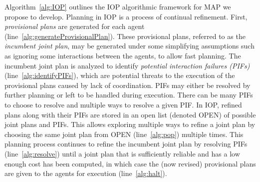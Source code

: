\documentclass[11pt]{article}
\begin{document}

Algorithm~\ref{alg:IOP} outlines the IOP algorithmic framework for MAP we propose to develop. Planning in IOP is a process of continual refinement.  
First, {\em provisional plans} are generated for each agent  (line~\ref{alg:generateProvisionalPlan}). These provisional plans, referred to as the {\em incumbent joint plan}, may be generated under some simplifying assumptions such as ignoring some interactions between the agents, to allow fast planning. The incumbent joint plan is analyzed to identify {\em potential interaction failures (PIFs)} (line~\ref{alg:identifyPIFs}), which are potential threats to the execution of the provisional plans caused by lack of coordination. 
PIFs may either be resolved by further planning or left to be handled during execution. 
There can be many PIFs to choose to resolve and multiple ways to resolve a given PIF. In IOP, refined plans along with their PIFs are stored in an open list (denoted OPEN) of possible joint plans and PIFs. This allows exploring multiple ways to refine a joint plan by choosing the same joint plan from OPEN (line~\ref{alg:pop}) multiple times.  
This planning process continues to refine the incumbent joint plan by resolving PIFs (line~\ref{alg:resolve}) until a joint plan that is sufficiently reliable and has a low enough cost has been computed, in which case the (now revised) provisional plans are given to the agents for execution (line~\ref{alg:halt}). 



\end{document}
